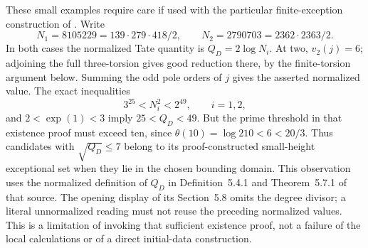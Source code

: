 These small examples require care if used with the particular
finite-exception construction of \cite[\S5.8]{JoshiIV}. Write
\[
 N_1=8105229=139\cdot279\cdot418/2,
 \qquad N_2=2790703=2362\cdot2363/2.
\]
In both cases the normalized Tate quantity is $Q_D=2\log N_i$.
At two, $v_2(j)=6$; adjoining the full three-torsion gives good
reduction there, by the finite-torsion argument below. Summing the
odd pole orders of $j$ gives the asserted normalized value.
The exact inequalities
\[
 3^{25}<N_i^2<2^{49},\qquad i=1,2,
\]
and $2<\exp(1)<3$ imply $25<Q_D<49$. But the prime threshold
in that existence proof must exceed ten, since
$\theta(10)=\log210<6<20/3$. Thus candidates with
$\sqrt{Q_D}\le7$ belong to its proof-constructed small-height
exceptional set when they lie in the chosen bounding domain.
This observation uses the normalized definition of $Q_D$ in
Definition~5.4.1 and Theorem~5.7.1 of that source. The opening
display of its Section~5.8 omits the degree divisor; a literal
unnormalized reading must not reuse the preceding normalized values.
This is a limitation of invoking that sufficient existence proof,
not a failure of the local calculations or of a direct initial-data
construction.


